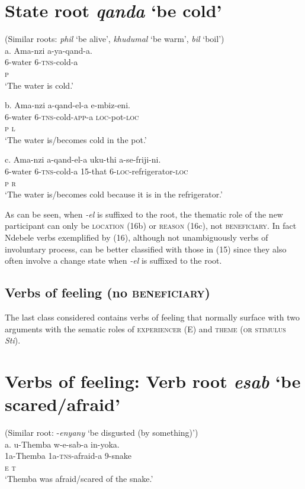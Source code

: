 \chapter[State root  qanda ‘be cold’]{State root  \textit{qanda} ‘be cold’}
       (Similar roots: \textit{phil} ‘be alive’, \textit{khudumal} ‘be warm’, \textit{bil} ‘boil’)\\
\gll   a.  Ama-nzi   a-ya-qand-a. \\
         6-water      6-\textsc{tns}{}-cold-a\\
         \textsc{p   }\\
\glt     ‘The water is cold.’
\z

\gll   b.  Ama-nzi    a-qand-el-a       e-mbiz-eni. \\
         6-water       6-\textsc{tns}{}-cold-\textsc{app}{}-a     \textsc{loc}{}-pot-\textsc{loc}\\
         \textsc{p                  l}\\
\glt     ‘The water is/becomes cold in the pot.’
\z

\gll   c.   Ama-nzi    a-qand-el-a     uku-thi        a-se-friji-ni. \\
         6-water       6-\textsc{tns}{}-cold-a     \textsc{15}{}-that       6-\textsc{loc}{}-refrigerator-\textsc{loc}        \\
         \textsc{p                          r      }\\
\glt     ‘The water is/becomes cold because it is in the refrigerator.’
\z

As can be seen, when \textit{{}-el} is suffixed to the root, the thematic role of the new participant can only be \textsc{location }(16b) or \textsc{reason }(16c), not \textsc{beneficiary}. In fact Ndebele verbs exemplified by (16), although not unambiguously verbs of involuntary process, can be better classified with those in (15) since they also often involve a change state when \textit{{}-el} is suffixed to the root.

\section{Verbs of feeling (no \textsc{beneficiary)}}

The last class considered contains verbs of feeling that normally surface with two arguments with the sematic roles of \textsc{experiencer} (E) and \textsc{theme }(\textsc{or stimulus}\textit{ Sti}). 

\chapter[Verbs of feeling: Verb root esab ‘be scared/afraid’]{Verbs of feeling: Verb root \textit{esab} ‘be scared/afraid’}
     (Similar root: -\textit{enyany} ‘be disgusted (by something)’)\\
\gll   a.  u-Themba    w-e-sab-a         in-yoka. \\
         1a-Themba  1a-\textsc{tns}{}-afraid-a  9-snake\\
         \textsc{e                      t }\\
\glt     ‘Themba was afraid/scared of the snake.’
\z

